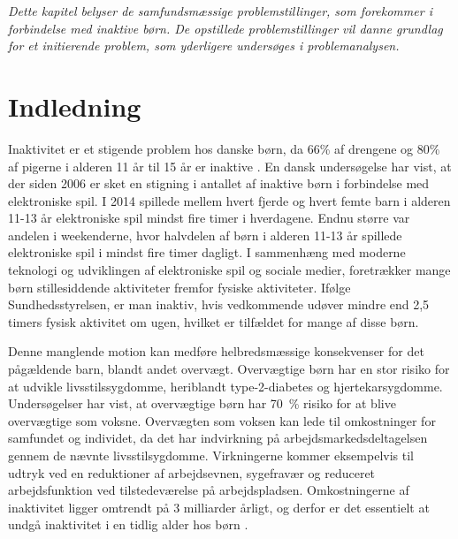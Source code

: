 \textit{Dette kapitel belyser de samfundsmæssige problemstillinger, som forekommer i forbindelse med inaktive børn. De opstillede problemstillinger vil danne grundlag for et initierende problem, som yderligere undersøges i problemanalysen.}

\section{Indledning}
Inaktivitet er et stigende problem hos danske børn, da 66\% af drengene og 80\% af pigerne i alderen 11 år til 15 år er inaktive \citep{SundhedsstyrrelsenFaktaark}. %
En dansk undersøgelse har vist, at der siden 2006 er sket en stigning i antallet af inaktive børn i forbindelse med elektroniske spil. I 2014 spillede mellem hvert fjerde og hvert femte barn i alderen 11-13 år elektroniske spil mindst fire timer i hverdagene. Endnu større var andelen i weekenderne, hvor halvdelen af børn i alderen 11-13 år spillede elektroniske spil i mindst fire timer dagligt. \citep{Universitet2014}  I sammenhæng med moderne teknologi  og udviklingen af elektroniske spil og sociale medier, foretrækker mange børn stillesiddende aktiviteter fremfor fysiske aktiviteter. \citep{Universitet2014} Ifølge Sundhedsstyrelsen, er man inaktiv, hvis vedkommende udøver mindre end 2,5 timers fysisk aktivitet om ugen, hvilket er tilfældet for mange af disse børn.  \citep{Kiens2007}

Denne manglende motion kan medføre helbredsmæssige konsekvenser for det pågældende barn, blandt andet overvægt. Overvægtige børn har en stor risiko for at udvikle livsstilssygdomme, heriblandt type-2-diabetes og hjertekarsygdomme. Undersøgelser har vist, at overvægtige børn har 70~\% risiko for at blive overvægtige som voksne. \citep{Reilly2006} 
Overvægten som voksen kan lede til omkostninger for samfundet og individet, da det har indvirkning på arbejdsmarkedsdeltagelsen gennem de nævnte livsstilsygdomme. Virkningerne kommer eksempelvis til udtryk ved en reduktioner af arbejdsevnen, sygefravær og reduceret arbejdsfunktion ved tilstedeværelse på arbejdspladsen. Omkostningerne af inaktivitet ligger omtrendt på 3 milliarder årligt, og derfor er det essentielt at undgå inaktivitet i en tidlig alder hos børn \citep{BarudThomsen2007, JuelSoerensenBroennum-Hansen2006}.

